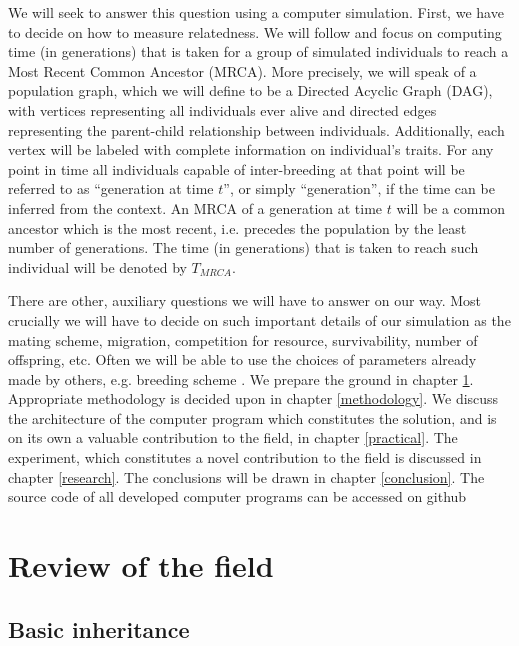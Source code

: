 \documentclass{l4proj}
\begin{document}
We will seek to answer this question using a computer simulation. First, we have to decide on how to measure relatedness. We will follow \cite{rohde04} and focus on computing time (in generations) that is taken for a group of simulated individuals to reach a Most Recent Common Ancestor (MRCA). More precisely, we will speak of a \gls{population graph}, which we will define to be a Directed Acyclic Graph (DAG), with vertices representing all individuals ever alive and directed edges representing the parent-child relationship between individuals. Additionally, each vertex will be labeled with complete information on individual's traits. For any point in time all individuals capable of inter-breeding at that point will be referred to as ``generation at time $t$'', or simply ``generation'', if the time can be inferred from the context. An MRCA of a generation at time $t$ will be a common ancestor which is the most recent, i.e. precedes the population by the least number of generations. The time (in generations) that is taken to reach such individual will be denoted by $T_{MRCA}$.

There are other, auxiliary questions we will have to answer on our way. Most crucially we will have to decide on such important details of our simulation as the mating scheme, migration, competition for resource, survivability, number of offspring, etc. Often we will be able to use the choices of parameters already made by others, e.g. breeding scheme \parencite{peng10}. We prepare the ground in chapter \ref{review}. Appropriate methodology is decided upon in chapter \ref{methodology}. We discuss the architecture of the computer program which constitutes the solution, and is on its own a valuable contribution to the field, in chapter \ref{practical}. The experiment, which constitutes a novel contribution to the field is discussed in chapter \ref{research}. The conclusions will be drawn in chapter \ref{conclusion}. The source code of all developed computer programs can be accessed on github \parencite{Kurkiewicz16} 


\chapter{Review of the field}\label{review}

\section{Basic inheritance}
\end{document}
